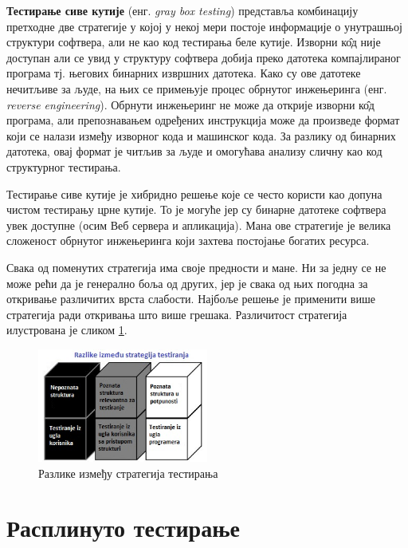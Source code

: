 \documentclass[12pt,oneside]{memoir}
\begin{document}
\begin{description}
\item \textbf{Тестирање сиве кутије} (енг. \textit{gray box testing}) представља комбинацију претходне две стратегије у којој у некој мери постоје информације о унутрашњој структури софтвера, али не као код тестирања беле кутије. Изворни к\^{о}д није доступан али се увид у структуру софтвера добија преко датотека компајлираног програма тј. његових бинарних извршних датотека. Како су ове датотеке нечитљиве за људе, на њих се примењује процес обрнутог инжењеринга (енг. \textit{reverse engineering}). Обрнути инжењеринг не може да открије изворни к\^{о}д програма, али препознавањем одређених инструкција може да произведе формат који се налази између изворног кода и машинског кода. За разлику од бинарних датотека, овај формат је читљив за људе и омогућава анализу сличну као код структурног тестирања. 
\par Тестирање сиве кутије је хибридно решење које се често користи као 	допуна чистом тестирању црне кутије. То је могуће јер су бинарне датотеке софтвера увек доступне (осим Веб сервера и апликација). Мана ове стратегије је велика сложеност обрнутог инжењеринга који захтева постојање богатих ресурса.
\end{description}

Свака од поменутих стратегија има своје предности и мане. Ни за једну се не може рећи да је генерално боља од других, јер је свака од њих погодна за откривање различитих врста слабости. Најбоље решење је применити више стратегија ради откривања што више грешака. Различитост стратегија илустрована је сликом \ref{fig:boxes}.

\begin{figure}[!ht]
\centering
\includegraphics[width=0.5\textwidth]{boxes.jpg}
\caption{Разлике између стратегија тестирања}
\label{fig:boxes}
\end{figure}
\section{Расплинуто тестирање}
\end{document}
